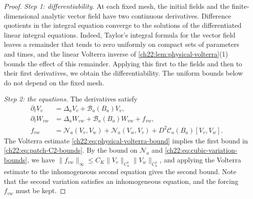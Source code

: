 \begin{proof}
\emph{Step 1: differentiability.} At each fixed mesh, the initial fields and the finite-dimensional analytic vector field have two continuous derivatives. Difference quotients in the integral equation converge to the solutions of the differentiated linear integral equations. Indeed, Taylor's integral formula for the vector field leaves a remainder that tends to zero uniformly on compact sets of parameters and times, and the linear Volterra inverse of \cref{ch22:lem:physical-volterra}(1) bounds the effect of this remainder. Applying this first to the fields and then to their first derivatives, we obtain the differentiability. The uniform bounds below do not depend on the fixed mesh.

\emph{Step 2: the equations.} The derivatives satisfy
\begin{equation}\label{ch22:eq:patch-variation-equations}
 \begin{split}
 \partial_tV_v&=\Delta_aV_v+\mathscr B_a(B_a)V_v,\\
 \partial_tW_{vw}&=\Delta_aW_{vw}+\mathscr B_a(B_a)W_{vw}+f_{vw},\\
 f_{vw}&=\mathcal N_a(V_v,V_w)+\mathcal N_a(V_w,V_v)+D^2\mathscr C_a(B_a)[V_v,V_w].
 \end{split}
\end{equation}
The Volterra estimate \eqref{ch22:eq:physical-volterra-bound} implies the first bound in \eqref{ch22:eq:patch-C2-bounds}. By the bound on $\mathcal N_a$ and \eqref{ch22:eq:cubic-variation-bounds}, we have $\|f_{vw}\|_\infty\le C_K\|V_v\|_{C_a^1}\|V_w\|_{C_a^1}$, and applying the Volterra estimate to the inhomogeneous second equation gives the second bound. Note that the second variation satisfies an inhomogeneous equation, and the forcing $f_{vw}$ must be kept.


\end{proof}
